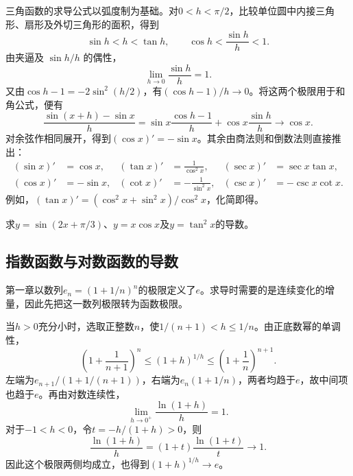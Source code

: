 三角函数的求导公式以弧度制为基础。对\(0<h<\pi/2\)，比较单位圆中内接三角形、扇形及外切三角形的面积，得到
\begin{equation*}
 \sin h<h<\tan h,
 \qquad \cos h<\frac{\sin h}{h}<1.
\end{equation*}
由夹逼及 \(\sin h/h\) 的偶性，
\begin{equation}\label{eq:calculus-sine-limit}
 \lim_{h\to0}\frac{\sin h}{h}=1.
\end{equation}
又由\(\cos h-1=-2\sin^2(h/2)\)，有\((\cos h-1)/h\to0\)。将这两个极限用于和角公式，便有
\begin{equation*}
 \frac{\sin(x+h)-\sin x}{h}
 =\sin x\frac{\cos h-1}h+\cos x\frac{\sin h}h\longrightarrow\cos x.
\end{equation*}
对余弦作相同展开，得到\((\cos x)'=-\sin x\)。其余由商法则和倒数法则直接推出：
\begin{equation*}
 \begin{aligned}
 (\sin x)'&=\cos x,& (\tan x)'&=\frac1{\cos^2x},& (\sec x)'&=\sec x\tan x,\\
 (\cos x)'&=-\sin x,& (\cot x)'&=-\frac1{\sin^2x},& (\csc x)'&=-\csc x\cot x.
 \end{aligned}
\end{equation*}
例如，\((\tan x)'=(\cos^2x+\sin^2x)/\cos^2x\)，化简即得。

\begin{example}
求\(y=\sin(2x+\pi/3)\)、\(y=x\cos x\)及\(y=\tan^2x\)的导数。
\end{example}

\newpage
\subsection{指数函数与对数函数的导数}

第一章以数列\(e_n=(1+1/n)^n\)的极限定义了\(e\)。求导时需要的是连续变化的增量，因此先把这一数列极限转为函数极限。

当\(h>0\)充分小时，选取正整数\(n\)，使\(1/(n+1)<h\le1/n\)。由正底数幂的单调性，
\begin{equation*}
 \left(1+\frac1{n+1}\right)^n
 \le(1+h)^{1/h}\le
 \left(1+\frac1n\right)^{n+1}.
\end{equation*}
左端为\(e_{n+1}/(1+1/(n+1))\)，右端为\(e_n(1+1/n)\)，两者均趋于\(e\)，故中间项也趋于\(e\)。再由对数连续性，
\begin{equation*}
 \lim_{h\to0^+}\frac{\ln(1+h)}h=1.
\end{equation*}
对于\(-1<h<0\)，令\(t=-h/(1+h)>0\)，则
\begin{equation*}
 \frac{\ln(1+h)}h=(1+t)\frac{\ln(1+t)}t\longrightarrow1.
\end{equation*}
因此这个极限两侧均成立，也得到\((1+h)^{1/h}\to e\)。

